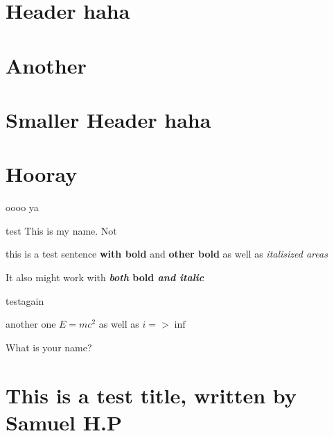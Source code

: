 \documentclass{article}
\begin{document}
\section*{\huge{Header haha}}
\normalsize{}

\section*{\LARGE{Another}}
\normalsize{}

\section*{\Large{Smaller Header haha}}
\normalsize{}

\section*{\large{Hooray}}
\normalsize{}

oooo ya

test This is my name. Not

this is a test sentence \textbf{with bold} and \textbf{other bold} as well as \textit{italisized areas}

It also might work with \textbf{\textit{both }bold\textit{ and italic}}

testagain

another one
$E=mc^2$ as well as $i => \inf$

What is your name?

\section*{\huge{This is a test title, written by Samuel H.P}}
\normalsize{}
\end{document}
